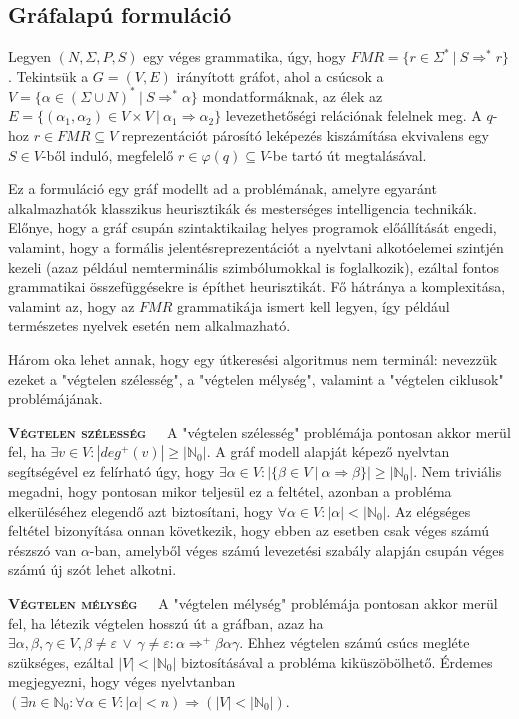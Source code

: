 \documentclass[twoside, 12pt]{report}
\begin{document}
\subsection{Gráfalapú formuláció}

Legyen $(N, \Sigma, P, S)$ egy véges grammatika, úgy, hogy $FMR = \{ r \in \Sigma^{*} \ | \ S \Rightarrow^{*} r \}$. Tekintsük a $G = (V, E)$ irányított gráfot, ahol a csúcsok a $V = \{ \alpha \in (\Sigma \cup N)^{*} \ | \ S \Rightarrow^{*} \alpha \}$ mondatformáknak, az élek az $E = \{ (\alpha_{1}, \alpha_{2}) \in V \times V \ | \ \alpha_{1} \Rightarrow \alpha_{2}  \}$ levezethetőségi relációnak felelnek meg. A $q$-hoz $r \in FMR \subseteq V$ reprezentációt párosító leképezés kiszámítása ekvivalens egy $S \in V$-ből induló, megfelelő $r \in \varphi(q) \subseteq V$-be tartó út megtalásával.

Ez a formuláció egy gráf modellt ad a problémának, amelyre egyaránt alkalmazhatók klasszikus heurisztikák és mesterséges intelligencia technikák. Előnye, hogy a gráf csupán szintaktikailag helyes programok előállítását engedi, valamint, hogy a formális jelentésreprezentációt a nyelvtani alkotóelemei szintjén kezeli (azaz például nemterminális szimbólumokkal is foglalkozik), ezáltal fontos grammatikai összefüggésekre is építhet heurisztikát. Fő hátránya a komplexitása, valamint az, hogy az $FMR$ grammatikája ismert kell legyen, így például természetes nyelvek esetén nem alkalmazható.

Három oka lehet annak, hogy egy útkeresési algoritmus nem terminál: nevezzük ezeket a "végtelen szélesség", a "végtelen mélység", valamint a "végtelen ciklusok" problémájának.

\textbf{\textsc{Végtelen szélesség}}\ \ \ A "végtelen szélesség" problémája pontosan akkor merül fel, ha $\exists v \in V: |deg^{+}(v)| \geq |\mathbb{N}_{0}| $. A gráf modell alapját képező nyelvtan segítségével ez felírható úgy, hogy $\exists \alpha \in V : |\{ \beta \in V \ | \ \alpha \Rightarrow \beta \}| \geq |\mathbb{N}_{0}|$. Nem triviális megadni, hogy pontosan mikor teljesül ez a feltétel, azonban a probléma elkerüléséhez elegendő azt biztosítani, hogy $ \forall \alpha \in V : |\alpha| < |\mathbb{N}_{0}|$. Az elégséges feltétel bizonyítása onnan következik, hogy ebben az esetben csak véges számú részszó van $\alpha$-ban, amelyből véges számú levezetési szabály alapján csupán véges számú új szót lehet alkotni.

\textbf{\textsc{Végtelen mélység}}\ \ \ A "végtelen mélység" problémája pontosan akkor merül fel, ha létezik végtelen hosszú út a gráfban, azaz ha $\exists \alpha, \beta, \gamma \in V, \beta \neq \varepsilon \, \lor \, \gamma \neq \varepsilon: \alpha \Rightarrow^{+} \beta \alpha \gamma$. Ehhez végtelen számú csúcs megléte szükséges, ezáltal $|V| < |\mathbb{N}_{0}|$ biztosításával a probléma kiküszöbölhető. Érdemes megjegyezni, hogy véges nyelvtanban $(\exists n \in \mathbb{N}_{0} : \forall \alpha \in V : |\alpha| < n) \Rightarrow (|V| < |\mathbb{N}_{0}|)$.
\end{document}
